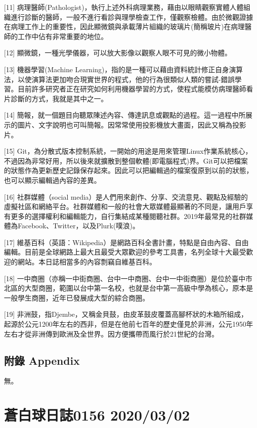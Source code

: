 \documentclass[a5paper, 12pt
]{book}
\begin{document}
{[}11{]}
病理醫師(Pathologist)，執行上述外科病理業務，藉由以眼睛觀察實體人體組織進行診斷的醫師，一般不進行看診與理學檢查工作，僅觀察檢體。由於微觀證據在病理工作上的重要性，因此顯微鏡與承載薄片組織的玻璃片(簡稱玻片)在病理醫師的工作中佔有非常重要的地位。

{[}12{]} 顯微鏡，一種光學儀器，可以放大影像以觀察人眼不可見的微小物體。

{[}13{]} 機器學習(Machine
Learning)，指的是一種可以藉由資料統計修正自身演算法，以使演算法更加吻合現實世界的程式，他的行為很類似人類的嘗試-錯誤學習。目前許多研究者正在研究如何利用機器學習的方式，使程式能模仿病理醫師看片診斷的方式，我就是其中之一。

{[}14{]}
簡報，就一個題目向聽眾陳述內容、傳達訊息或觀點的過程。這一過程中所展示的圖片、文字說明也可叫簡報。因常常使用投影機放大畫面，因此又稱為投影片。

{[}15{]}
Git，為分散式版本控制系統，一開始的用途是用來管理Linux作業系統核心，不過因為非常好用，所以後來就擴散到整個軟體(即電腦程式)界。Git可以把檔案的狀態作為更新歷史記錄保存起來。因此可以把編輯過的檔案復原到以前的狀態，也可以顯示編輯過內容的差異。

{[}16{]} 社群媒體（social
media）是人們用來創作、分享、交流意見、觀點及經驗的虛擬社區和網絡平台。社群媒體和一般的社會大眾媒體最顯著的不同是，讓用戶享有更多的選擇權利和編輯能力，自行集結成某種閱聽社群。2019年最常見的社群媒體為Facebook、Twitter，以及Plurk(噗浪)。

{[}17{]}
維基百科（英語：Wikipedia）是網路百科全書計畫，特點是自由內容、自由編輯。目前是全球網路上最大且最受大眾歡迎的參考工具書，名列全球十大最受歡迎的網站。本日誌相當多的內容剽竊自維基百科。

{[}18{]}
一中商圈（亦稱一中街商圈、台中一中商圈、台中一中街商圈）是位於臺中市北區的大型商圈，範圍以台中第一名校，也就是台中第一高級中學為核心，原本是一般學生商圈，近年已發展成大型的綜合商圈。

{[}19{]}
非洲鼓，指Djembe，又稱金貝鼓，由皮革鼓皮覆蓋高腳杯狀的木箱所組成，起源於公元1200年左右的西非，但是在他前七百年的歷史僅見於非洲，公元1950年左右才從非洲傳到歐洲及全世界。因方便攜帶而風行於21世紀的台灣。

\hypertarget{ux9644ux9304-appendix}{%
\subsection{附錄 Appendix}\label{ux9644ux9304-appendix}}

無。

\hypertarget{ux84bcux767dux7403ux65e5ux8a8c0156-20200302}{%
\section{蒼白球日誌0156
2020/03/02}\label{ux84bcux767dux7403ux65e5ux8a8c0156-20200302}}
\end{document}
